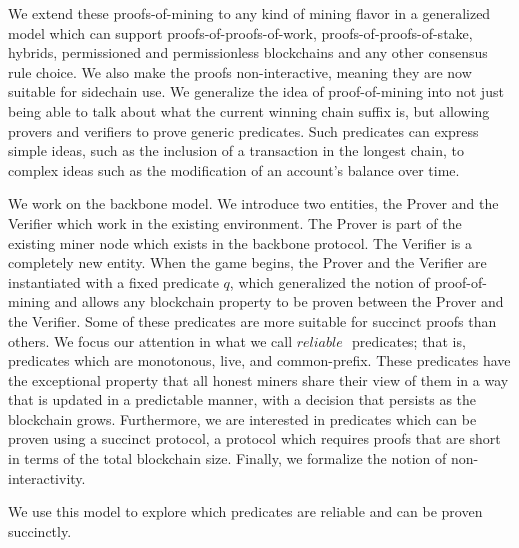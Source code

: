 We extend these proofs-of-mining to any kind of mining flavor in a generalized
model which can support proofs-of-proofs-of-work, proofs-of-proofs-of-stake,
hybrids, permissioned and permissionless blockchains and any other consensus
rule choice. We also make the proofs non-interactive, meaning they are now
suitable for sidechain use. We generalize the idea of proof-of-mining into not
just being able to talk about what the current winning chain suffix is, but
allowing provers and verifiers to prove generic predicates. Such predicates can
express simple ideas, such as the inclusion of a transaction in the longest
chain, to complex ideas such as the modification of an account's balance over
time.

We work on the backbone model. We introduce two entities, the Prover and the
Verifier which work in the existing environment. The Prover is part of the
existing miner node which exists in the backbone protocol. The Verifier is a
completely new entity. When the game begins, the Prover and the Verifier are
instantiated with a fixed predicate $q$, which generalized the notion of
proof-of-mining and allows any blockchain property to be proven between the
Prover and the Verifier. Some of these predicates are more suitable for
succinct proofs than others. We focus our attention in what we call $\textit{
reliable }$ predicates; that is, predicates which are monotonous, live, and
common-prefix. These predicates have the exceptional property that all honest
miners share their view of them in a way that is updated in a predictable
manner, with a decision that persists as the blockchain grows. Furthermore, we
are interested in predicates which can be proven using a succinct protocol, a
protocol which requires proofs that are short in terms of the total blockchain
size. Finally, we formalize the notion of non-interactivity.

We use this model to explore which predicates are reliable and can be proven
succinctly.
